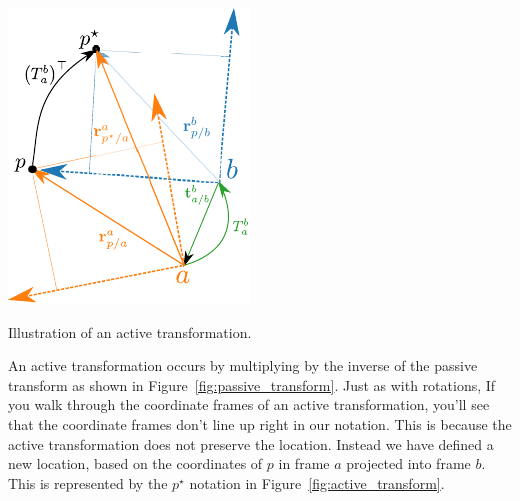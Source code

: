 \begin{marginfigure}
\includegraphics[width=\linewidth]{chap2_preliminaries/figures/transform_active}
\caption{Illustration of an active transformation.}
\label{fig:active_transform}
\end{marginfigure}

An active transformation occurs by multiplying by the inverse of the
passive transform as shown in Figure~\ref{fig:passive_transform}.
Just as with rotations, If you walk through the coordinate frames
of an active transformation, you'll see that the coordinate frames
don't line up right in our notation. This is because the active transformation
does not preserve the location. Instead we have defined a new location,
based on the coordinates of $p$ in frame $a$ projected into frame
$b$. This is represented by the $p^{\star}$ notation
in Figure~\ref{fig:active_transform}.

